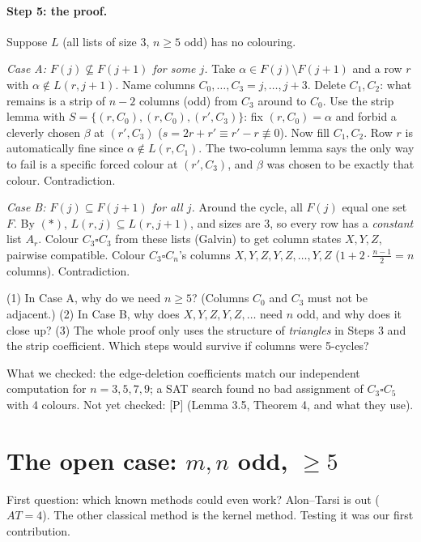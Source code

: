 \documentclass[11pt]{article}
\theoremstyle{plain}
\theoremstyle{definition}
\newcommand{\T}{\square}
\begin{document}
\paragraph{Step 5: the proof.} Suppose $L$ (all lists of size 3, $n\ge5$ odd) has no colouring.

\emph{Case A: $F(j)\not\subseteq F(j+1)$ for some $j$.} Take $\alpha\in F(j)\setminus F(j+1)$
and a row $r$ with $\alpha\notin L(r,j+1)$. Name columns $C_0,\dots,C_3=j,\dots,j+3$. Delete
$C_1,C_2$: what remains is a strip of $n-2$ columns (odd) from $C_3$ around to $C_0$. Use the
strip lemma with $S=\{(r,C_0),(r,C_0),(r',C_3)\}$: fix $(r,C_0)=\alpha$ and forbid a
cleverly chosen $\beta$ at $(r',C_3)$ ($s=2r+r'\equiv r'-r\not\equiv0$). Now fill $C_1,C_2$.
Row $r$ is automatically fine since $\alpha\notin L(r,C_1)$. The two-column lemma says the
only way to fail is a specific forced colour at $(r',C_3)$, and $\beta$ was chosen to be
exactly that colour. Contradiction.

\emph{Case B: $F(j)\subseteq F(j+1)$ for all $j$.} Around the cycle, all $F(j)$ equal one
set $F$. By $(\ast)$, $L(r,j)\subseteq L(r,j+1)$, and sizes are 3, so every row has a
\emph{constant} list $A_r$. Colour $C_3\T C_3$ from these lists (Galvin) to get column states
$X,Y,Z$, pairwise compatible. Colour $C_3\T C_n$'s columns $X,Y,Z,Y,Z,\dots,Y,Z$ ($1+2\cdot\frac{n-1}2=n$
columns). Contradiction.

\begin{ponder}
(1) In Case A, why do we need $n\ge5$? (Columns $C_0$ and $C_3$ must not be adjacent.)
(2) In Case B, why does $X,Y,Z,Y,Z,\ldots$ need $n$ odd, and why does it close up?
(3) The whole proof only uses the structure of \emph{triangles} in Steps 3 and the strip
coefficient. Which steps would survive if columns were 5-cycles?
\end{ponder}

\begin{status}
What we checked: the edge-deletion coefficients match our independent computation for
$n=3,5,7,9$; a SAT search found no bad assignment of $C_3\T C_5$ with 4 colours. Not yet
checked: [P] (Lemma 3.5, Theorem 4, and what they use).
\end{status}

\section{The open case: \texorpdfstring{$m,n$}{m, n} odd, \texorpdfstring{$\ge5$}{>= 5}}

First question: which known methods could even work? Alon--Tarsi is out ($AT=4$). The other
classical method is the kernel method. Testing it was our first contribution.
\end{document}
